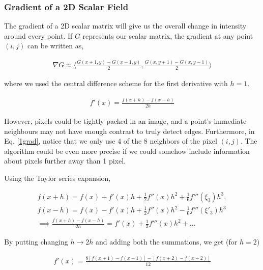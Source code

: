 \subsubsection{Gradient of a 2D Scalar Field}
The gradient of a 2D scalar matrix will give us the overall change in intensity around every point. If $G$ represents our scalar matrix, the gradient at any point $(i,j)$ can be written as,

\begin{align} \label{1grad}
\nabla G \approx \biggl \langle \frac{G(x+1,y)-G(x-1,y)}{2} , \frac{G(x,y+1)-G(x,y-1)}{2}\biggl \rangle 
\end{align}

where we used the central difference scheme for the first derivative with $h=1$. 

\begin{align} \label{firstderivative}
    f'(x) = \frac{f(x+h)-f(x-h)}{2h}
\end{align}

However, pixels could be tightly packed in an image, and a point's immediate neighbours may not have enough contrast to truly detect edges. Furthermore, in Eq. \ref{1grad}, notice that we only use 4
of the 8 neighbors of the pixel $(i,j)$. The algorithm could be even more precise if we could somehow include information about pixels further away than 1 pixel.

Using the Taylor series expansion,

\begin{align}
    f(x+h) = f(x) + f'(x)h + \frac1{2}f''(x)h^2 +\frac1{6}f'''(\xi_3)h^3,\\f(x-h) = f(x) - f'(x)h + \frac1{2}f''(x)h^2 -\frac1{6}f'''(\xi'_3)h^3\\
    \implies \frac{f(x+h)-f(x-h)}{2h} = f'(x) + \frac{1}{3}f'''(x)h^2 + ...
\end{align}

By putting changing $h \rightarrow 2h$ and adding both the summations, we get (for $h=2$)

\begin{align} \label{edge2}
    f'(x) = \frac{8\left[f(x+1)-f(x-1)\right] - \left[f(x+2)-f(x-2)\right]}{12}
\end{align}



